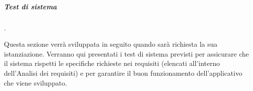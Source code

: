 \subparagraph{Test di sistema} {\color{white}.}

Questa sezione verrà sviluppata in seguito quando sarà richiesta la sua istanziazione.  Verranno qui presentati i test di sistema previsti per assicurare che il sistema rispetti le specifiche richieste nei requisiti (elencati all'interno dell'Analisi dei  requisiti)  e  per  garantire  il  buon  funzionamento  dell'applicativo  che  viene sviluppato.
